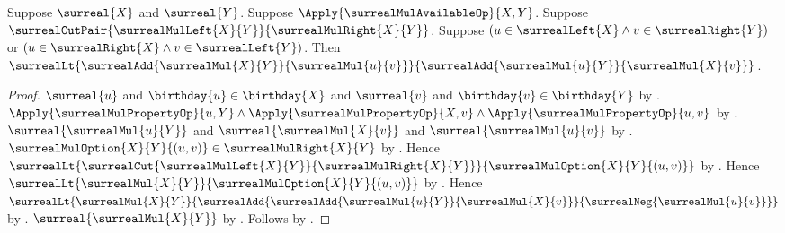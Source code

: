 \begin{lemma}\label{surreal_mul_right_inequality_from_available}
    Suppose $\surreal{X}$ and $\surreal{Y}$.
    Suppose $\Apply{\surrealMulAvailableOp}{X,Y}$.
    Suppose $\surrealCutPair{\surrealMulLeft{X}{Y}}
        {\surrealMulRight{X}{Y}}$.
    Suppose $(u\in\surrealLeft{X}\land v\in\surrealRight{Y})$
        or $(u\in\surrealRight{X}\land v\in\surrealLeft{Y})$.
    Then
        $\surrealLt
            {\surrealAdd{\surrealMul{X}{Y}}{\surrealMul{u}{v}}}
            {\surrealAdd{\surrealMul{u}{Y}}{\surrealMul{X}{v}}}$.
\end{lemma}
\begin{proof}
    $\surreal{u}$ and $\birthday{u}\in\birthday{X}$ and
        $\surreal{v}$ and $\birthday{v}\in\birthday{Y}$
        by .
    $\Apply{\surrealMulPropertyOp}{u,Y}
        \land\Apply{\surrealMulPropertyOp}{X,v}
        \land\Apply{\surrealMulPropertyOp}{u,v}$
        by .
    $\surreal{\surrealMul{u}{Y}}$ and
        $\surreal{\surrealMul{X}{v}}$ and
        $\surreal{\surrealMul{u}{v}}$
        by .
    $\surrealMulOption{X}{Y}{(u,v)}
        \in\surrealMulRight{X}{Y}$
        by .
    Hence
        $\surrealLt
            {\surrealCut{\surrealMulLeft{X}{Y}}{\surrealMulRight{X}{Y}}}
            {\surrealMulOption{X}{Y}{(u,v)}}$
        by .
    Hence
        $\surrealLt{\surrealMul{X}{Y}}
            {\surrealMulOption{X}{Y}{(u,v)}}$
        by .
    Hence
        $\surrealLt{\surrealMul{X}{Y}}
            {\surrealAdd
                {\surrealAdd{\surrealMul{u}{Y}}{\surrealMul{X}{v}}}
                {\surrealNeg{\surrealMul{u}{v}}}}$
        by .
    $\surreal{\surrealMul{X}{Y}}$
        by .
    Follows by
        .
\end{proof}

